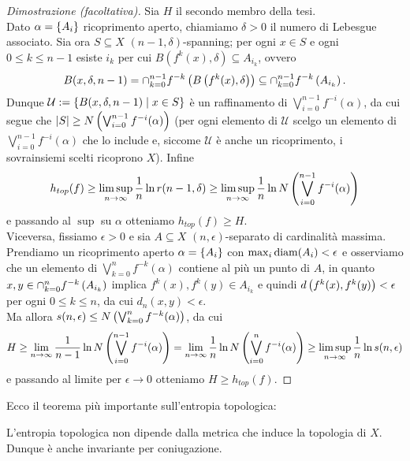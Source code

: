 \begin{proof}[Dimostrazione (facoltativa)]Sia $H$ il secondo membro della tesi. \\
Dato $\alpha=\left\{A_i\right\}$ ricoprimento aperto, chiamiamo $\delta>0$ il numero di Lebesgue
associato. Sia ora $S\subseteq X$ $(n-1,\delta)$-spanning; per ogni $x\in S$ e ogni $0\le k\le n-1$ esiste $i_k$ per cui
$B(f^k(x),\delta)\subseteq A_{i_k}$, ovvero
\[ B(x,\delta,n-1)=\cap_{k=0}^{n-1} f^{-k}\left(B\left(f^k(x),\delta\right)\right)\subseteq\cap_{k=0}^{n-1} f^{-k}\left(A_{i_k}\right). \]
Dunque $\mathcal{U}:=\left\{B(x,\delta,n-1)\mid x\in S\right\}$ è un raffinamento di $\bigvee_{i=0}^{n-1}f^{-i}(\alpha)$,
da cui segue che $\left|S\right|\ge N\left(\bigvee_{i=0}^{n-1}f^{-i}(\alpha)\right)$ (per ogni elemento di $\mathcal{U}$
scelgo un elemento di $\bigvee_{i=0}^{n-1}f^{-i}(\alpha)$ che lo include e, siccome $\mathcal{U}$ è anche un ricoprimento,
i sovrainsiemi scelti ricoprono $X$). Infine
\[ h_{top}(f)\ge\limsup_{n\to\infty}\frac{1}{n}\ln r(n-1,\delta)
\ge\limsup_{n\to\infty}\frac{1}{n}\ln N\left(\bigvee_{i=0}^{n-1}f^{-i}(\alpha)\right) \]
e passando al $\sup$ su $\alpha$ otteniamo $h_{top}(f)\ge H$. \\
Viceversa, fissiamo $\epsilon>0$ e sia $A\subseteq X$ $(n,\epsilon)$-separato di cardinalità massima.
Prendiamo un ricoprimento aperto $\alpha=\left\{A_i\right\}$ con $\max_i\operatorname{diam}(A_i)<\epsilon$ e osserviamo
che un elemento di $\bigvee_{k=0}^n f^{-k}(\alpha)$ contiene al più un punto di $A$,
in quanto $x,y\in\cap_{k=0}^n f^{-k}\left(A_{i_k}\right)$ implica $f^k(x),f^k(y)\in A_{i_k}$ e quindi $d\left(f^k(x),f^k(y)\right)<\epsilon$
per ogni $0\le k\le n$, da cui $d_n(x,y)<\epsilon$. \\
Ma allora $s(n,\epsilon)\le N\left(\bigvee_{k=0}^n f^{-k}(\alpha)\right)$, da cui
\[ H\ge\lim_{n\to\infty}\frac{1}{n-1}\ln N\left(\bigvee_{i=0}^{n-1}f^{-i}(\alpha)\right)
=\lim_{n\to\infty}\frac{1}{n}\ln N\left(\bigvee_{i=0}^n f^{-i}(\alpha)\right)\ge\limsup_{n\to\infty}\frac{1}{n}\ln s(n,\epsilon) \]
e passando al limite per $\epsilon\to 0$ otteniamo $H\ge h_{top}(f)$.
\end{proof}

Ecco il teorema più importante sull'entropia topologica:

\begin{teo}L'entropia topologica non dipende dalla metrica che induce la topologia di $X$.
Dunque è anche invariante per coniugazione.
\end{teo}

